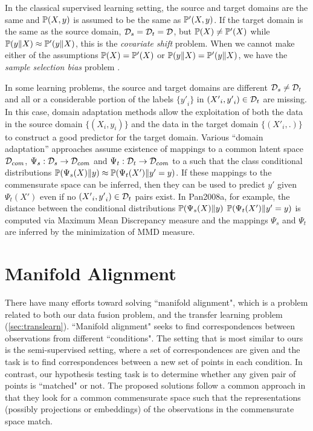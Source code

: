 \documentclass[12pt,oneside,final]{thesis}
\begin{document}
In the classical supervised learning setting, the source and target domains are the same and  $\mathbb{P}(X,y)$ is assumed to be the same as $\mathbb{P}'(X,y)$. If the target domain is the same as the source domain, ${\mathcal{D}}_s={\mathcal{D}}_t=\mathcal{D}$, but $\mathbb{P}(X) \neq\mathbb{P}'(X)$ while $\mathbb{P}(y\|X) \approx \mathbb{P}'(y \| X)$, this is the \emph{covariate shift} problem.  When we cannot make either of the assumptions $\mathbb{P}(X) = \mathbb{P}'(X)$ or $\mathbb{P}(y\|X) = \mathbb{P}'(y \| X)$, we have the \emph{sample selection bias} problem \cite{Zadrozny2004a}.


 In some learning problems, the source and target domains are different ${\mathcal{D}}_s \neq {\mathcal{D}}_t$ and all or a considerable portion of  the labels $\{{y'}_i\}$  in $\left({X'}_i,{y'}_i\right) \in {\mathcal{D}}_t$ are missing. In this case, domain adaptation methods allow the exploitation of both the  data in the source domain $\{\left({X}_i,{y}_i\right)\}$ and the data in the target domain  $\{\left({X'}_i,.\right)\}$ to construct a good predictor for the target domain\cite{DaumeIII2006,Ben-David_Dom_Adapt2007,Ling2008,Pan2008a}.
Various ``domain adaptation'' approaches\cite{Pan2008a,LowRankSharedConceptChen2012a} assume existence of mappings to a common latent space ${\mathcal{D}}_{com}$,  $\Psi_s:{\mathcal{D}}_s \rightarrow {\mathcal{D}}_{com} $ and $\Psi_t:{\mathcal{D}}_t \rightarrow {\mathcal{D}}_{com}$ to a  such that the class conditional distributions $\mathbb{P}(\Psi_s(X) \|y) \approx \mathbb{P}(\Psi_t(X') \| y'=y)$.  If these mappings to the commensurate space can be inferred, then they can be used to predict $y'$ given $\Psi_t(X')$ even if no $\left({X'}_i,{y'}_i\right) \in {\mathcal{D}}_t$ pairs exist. 
In {Pan2008a}, for example, the distance between the conditional distributions $\mathbb{P}(\Psi_s(X) \|y) $ $\mathbb{P}(\Psi_t(X') \| y'=y)$ is computed via  Maximum Mean Discrepancy
measure and  the mappings $\Psi_s$ and  $\Psi_t$  are inferred by the minimization of MMD measure.

\section[Manifold Matching]{Manifold Alignment}
There have many efforts toward solving ``manifold alignment", which is a problem related to both our data fusion problem, and the transfer learning problem (\autoref{sec:translearn}). ``Manifold alignment" seeks to find correspondences between observations from different ``conditions". The setting that is most similar to ours is the semi-supervised setting, where a set of correspondences are given and the task is to find correspondences between a new set of points in each condition. In contrast, our hypothesis testing task is to determine whether any given pair of points is ``matched" or not. The proposed solutions follow a common approach in that they look for a common commensurate space such that the representations (possibly projections or embeddings) of the observations in the commensurate space match.
\end{document}
